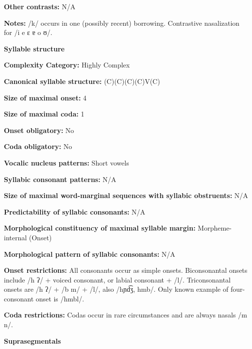 \textbf{Other contrasts:} N/A



\textbf{Notes:} /k/ occurs in one (possibly recent) borrowing. Contrastive nasalization for /i e ɛ ɐ o ʊ/.



\textbf{Syllable structure}



\textbf{Complexity Category:} Highly Complex



\textbf{Canonical syllable structure:} (C)(C)(C)(C)V(C) \citep[68-76]{Marmion2010}



\textbf{Size of maximal onset:} 4



\textbf{Size of maximal coda:} 1



\textbf{Onset obligatory:} No



\textbf{Coda obligatory:} No



\textbf{Vocalic nucleus patterns:} Short vowels



\textbf{Syllabic consonant patterns:} N/A



\textbf{Size of maximal word{}-marginal sequences with syllabic obstruents:} N/A



\textbf{Predictability of syllabic consonants:} N/A



\textbf{Morphological constituency of maximal syllable margin:} Morpheme-internal (Onset)



\textbf{Morphological pattern of syllabic consonants:} N/A



\textbf{Onset restrictions:} All consonants occur as simple onsets. Biconsonantal onsets include /h ʔ/ + voiced consonant, or labial consonant + /l/. Triconsonantal onsets are /h ʔ/ + /b m/ + /l/, also /hɲd͡ʒ, hmb/. Only known example of four-consonant onset is /hmbl/.



\textbf{Coda restrictions:} Codas occur in rare circumstances and are always nasals /m n/.



\textbf{Suprasegmentals}



